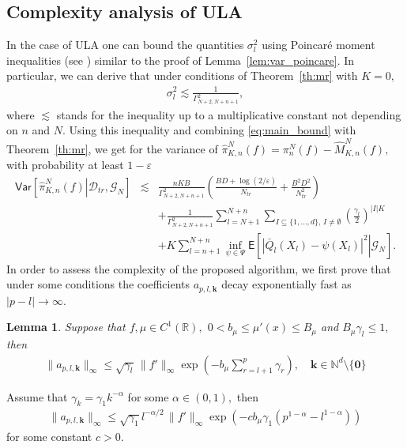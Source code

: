 \documentclass[article]{elsarticle}
\newtheorem{lem}[thm]{Lemma}
\begin{document}
\subsection{Complexity analysis of ULA}
In the case of ULA one can bound the quantities \(\sigma_l^2\) using  Poincar\'e moment inequalities  (see \cite{aida1994moment}) similar to the proof of Lemma~\ref{lem:var_poincare}.
In particular, we can derive that  under conditions of Theorem~\ref{th:mr} with \(K=0,\)
\begin{eqnarray*}
\sigma_l^2\lesssim \frac{1}{\Gamma^2_{N+2,N+n+1}},
\end{eqnarray*}
where \(\lesssim \) stands for the inequality up to a multiplicative constant not depending on \(n\) and \(N.\) Using this inequality and combining \eqref{eq:main_bound} with Theorem~\ref{th:mr}, we get for the variance of \(\widehat \pi_{K,n}^N(f)=\pi_n^N(f)-\widehat M_{K,n}^N(f),\) with probability at least \(1-\varepsilon\)
\begin{eqnarray}
\nonumber
\mathsf{Var}\left[\left.\widehat \pi_{K,n}^N(f)\right | \mathcal{D}_{tr}, \mathcal{G}_N\right]&\lesssim & \frac{n KB}{\Gamma^2_{N+2,N+n+1}}
\left(\frac{BD+\log(2/\varepsilon)}{N_{tr}}+\frac{B^2D^2}{N_{tr}^2}\right)
\\
\nonumber
&& + \frac{1}{\Gamma^2_{N+2,N+n+1}}\sum_{l=N+1}^{N+n}\sum_{I\subseteq\{1,\ldots,d\},\, I\neq \emptyset}
\left(\frac{\gamma_{l}}{2}\right)^{|I|K}
\\
\label{eq:ula_red_var}
&& +
K \sum_{l=n+1}^{N+n}\inf_{\psi\in \Psi}
\mathsf{E}\left[\left.\left|\bar Q_l(X_{l})-\psi(X_{l})\right|^{2}\right | \mathcal{G}_N \right].
\end{eqnarray}
In order to assess the complexity of the proposed algorithm,  we first prove that under some conditions the coefficients \(a_{p,l,\mathbf{k}}\) decay exponentially fast as \(|p-l|\to \infty.\)
\begin{lem}
\label{a_decay}
Suppose that \(f,\mu\in C^1(\mathbb{R}),\) \(0<b_\mu\leq \mu'(x)\leq B_\mu\) and \(B_\mu\gamma_{l}\leq 1,\) then
\begin{eqnarray*}
\|a_{p,l,\mathbf{k}}\|_{\infty}\leq \sqrt{\gamma_l}\, \|f'\|_\infty\exp\left(-b_{\mu}\sum_{r=l+1}^p \gamma_{r}  \right),\quad \mathbf{k}\in \mathbb{N}^d\setminus \{\mathbf{0}\}
\end{eqnarray*}
\end{lem}
\begin{cor}
Assume that \(\gamma_k=\gamma_1 k^{-\alpha}\) for some \(\alpha\in (0,1),\) then
\begin{eqnarray*}
\|a_{p,l,\mathbf{k}}\|_{\infty}\leq \sqrt{\gamma_1} l^{-\alpha/2}\, \|f'\|_\infty\exp\left(-c b_{\mu}\gamma_1 (p^{1-\alpha}-l^{1-\alpha}) \right)
\end{eqnarray*}
for some constant \(c>0.\)
\end{cor}
\end{document}
